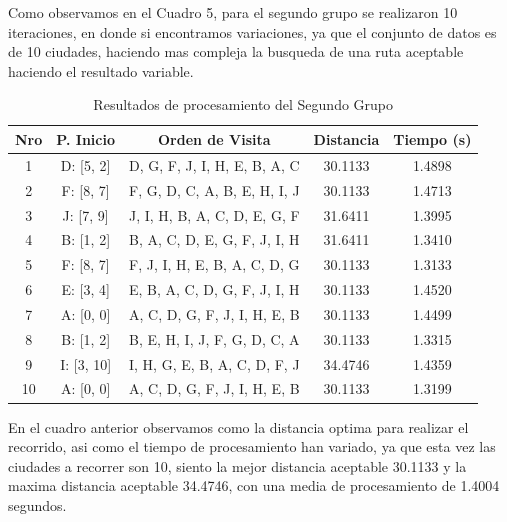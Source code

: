 \documentclass{article}
\begin{document}
Como observamos en el Cuadro 5, para el segundo grupo se realizaron 10 iteraciones, en donde si encontramos variaciones, ya que el conjunto de datos es de 10 ciudades, haciendo mas compleja la busqueda de una ruta aceptable haciendo el resultado variable.\\

\begin{table}[h]
  \centering
  \caption{Resultados de procesamiento del Segundo Grupo}
  \begin{tabular}{|c|c|c|c|c|}
    \hline
    \textbf{Nro} & \textbf{P. Inicio} & \textbf{Orden de Visita} & \textbf{Distancia} & \textbf{Tiempo (s)}\\
    \hline
    1 & D: [5, 2] & D, G, F, J, I, H, E, B, A, C & 30.1133 & 1.4898 \\
    \hline
    2 & F: [8, 7] & F, G, D, C, A, B, E, H, I, J & 30.1133 & 1.4713 \\
    \hline
    3 & J: [7, 9] & J, I, H, B, A, C, D, E, G, F & 31.6411 & 1.3995 \\
    \hline
    4 & B: [1, 2] & B, A, C, D, E, G, F, J, I, H & 31.6411 & 1.3410 \\
    \hline
    5 & F: [8, 7] & F, J, I, H, E, B, A, C, D, G & 30.1133 & 1.3133 \\
    \hline
    6 & E: [3, 4] & E, B, A, C, D, G, F, J, I, H & 30.1133 & 1.4520 \\
    \hline
    7 & A: [0, 0] & A, C, D, G, F, J, I, H, E, B & 30.1133 & 1.4499 \\
    \hline
    8 & B: [1, 2] & B, E, H, I, J, F, G, D, C, A & 30.1133 & 1.3315 \\
    \hline
    9 & I: [3, 10]& I, H, G, E, B, A, C, D, F, J & 34.4746 & 1.4359 \\
    \hline
    10 & A: [0, 0] & A, C, D, G, F, J, I, H, E, B & 30.1133 & 1.3199 \\
    \hline
  \end{tabular}
\end{table}

En el cuadro anterior observamos como la distancia optima para realizar el recorrido, asi como el tiempo de procesamiento han variado, ya que esta vez las ciudades a recorrer son 10, siento la mejor distancia aceptable 30.1133 y la maxima distancia aceptable 34.4746, con una media de procesamiento de 1.4004 segundos.\\
\end{document}
